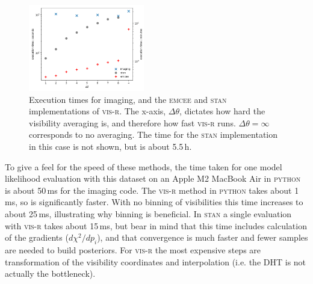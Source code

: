 \documentclass[fleqn,usenatbib]{mnras}
\begin{document}
\begin{figure}
    \centering
    \includegraphics[width=0.45\textwidth]{doc/timing.png}
    \caption{Execution times for imaging, and the \textsc{emcee} and \textsc{stan} implementations of \textsc{vis-r}. The x-axis, $\Delta \theta$, dictates how hard the visibility averaging is, and therefore how fast \textsc{vis-r} runs. $\Delta \theta = \infty$ corresponds to no averaging. The time for the \textsc{stan} implementation in this case is not shown, but is about 5.5\,h.}
    \label{fig:timing}
\end{figure}

To give a feel for the speed of these methods, the time taken for one model likelihood evaluation with this dataset on an Apple M2 MacBook Air in \textsc{python} is about 50\,ms for the imaging code. The \textsc{vis-r} method in \textsc{python} takes about 1\,ms, so is significantly faster. With no binning of visibilities this time increases to about 25\,ms, illustrating why binning is beneficial. In \textsc{stan} a single evaluation with \textsc{vis-r} takes about 15\,ms, but bear in mind that this time includes calculation of the gradients ($d \chi^2 / dp_i$), and that convergence is much faster and fewer samples are needed to build posteriors. For \textsc{vis-r} the most expensive steps are transformation of the visibility coordinates and interpolation (i.e. the DHT is not actually the bottleneck).
\end{document}
